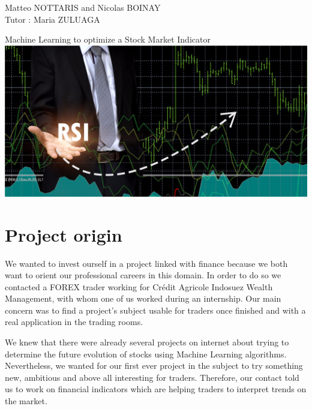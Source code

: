\documentclass[]{article}
\begin{document}
\begin{titlepage}

\begin{flushleft}
Matteo NOTTARIS and Nicolas BOINAY \\
\bigskip
Tutor : Maria ZULUAGA
\end{flushleft}

\vspace*{\fill}  
\begin{center}  
     {\LARGE Machine Learning to optimize a Stock Market Indicator}\\[15mm]
     \includegraphics[scale=0.30]{image/rsi_bourse.png}
	 \centering
\end{center}
\vspace*{\fill} 

\end{titlepage}

\doublespacing

\renewcommand*\contentsname{Summary}

\tableofcontents
\clearpage
\singlespacing

\section{Project origin}

\vskip 0.3cm
We wanted to invest ourself in a project linked with finance because we both want to orient our professional careers in this domain.
In order to do so we contacted a FOREX trader working for Crédit Agricole Indosuez Wealth Management, with whom one of us worked during an internship. Our main concern was to find a project's subject usable for traders once finished and with a real application in the trading rooms.

\vskip 0.3cm
We knew that there were already several projects on internet about trying to determine the future evolution of stocks using Machine Learning algorithms. Nevertheless, we wanted for our first ever project in the subject to try something new, ambitious and above all interesting for traders. Therefore, our contact told us to work on financial indicators which are helping traders to interpret trends on the market.
\end{document}
